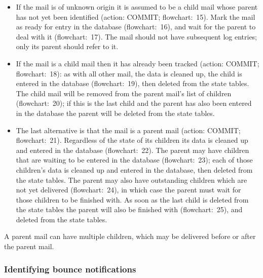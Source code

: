\begin{itemize}

    \item If the mail is of unknown origin it is assumed to be a child mail
        whose parent has not yet been identified (action: COMMIT\@;
        flowchart:~15).  Mark the mail as ready for entry in the database
        (flowchart:~16), and wait for the parent to deal with it
        (flowchart:~17).  The mail should not have subsequent log entries;
        only its parent should refer to it.

    \item If the mail is a child mail then it has already been tracked
        (action: COMMIT\@; flowchart:~18): as with all other mail, the data
        is cleaned up, the child is entered in the database
        (flowchart:~19), then deleted from the state tables.  The child
        mail will be removed from the parent mail's list of children
        (flowchart:~20); if this is the last child and the parent has also
        been entered in the database the parent will be deleted from the
        state tables.

    \item The last alternative is that the mail is a parent mail (action:
        COMMIT\@; flowchart:~21).  Regardless of the state of its children
        its data is cleaned up and entered in the database (flowchart:~22).
        The parent may have children that are waiting to be entered in the
        database (flowchart:~23); each of those children's data is cleaned
        up and entered in the database, then deleted from the state tables.
        The parent may also have outstanding children which are not yet
        delivered (flowchart:~24), in which case the parent must wait for
        those children to be finished with.  As soon as the last child is
        deleted from the state tables the parent will also be finished with
        (flowchart:~25), and deleted from the state tables.

\end{itemize}

A parent mail can have multiple children, which may be delivered before or
after the parent mail.


\subsubsection{Identifying bounce notifications}

\label{identifying-bounce-notifications}

